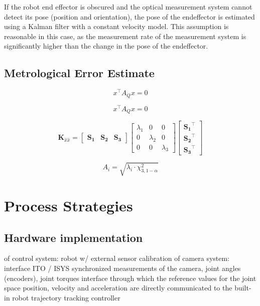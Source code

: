 \documentclass[5p,times,procedia]{elsarticle}
\begin{document}
If the robot end effector is obscured and the optical measurement system cannot detect its pose (position and orientation), the pose of the endeffector is estimated using a Kalman filter with a constant velocity model. This assumption is reasonable in this case, as the measurement rate of the measurement system is significantly higher than the change in the pose of the endeffector.

\subsection{Metrological Error Estimate}
\label{error_estimate}

\cite{Di_Leo_2011}
\cite{Liu_2021}

\begin{equation}
	x^\top A_Q x = 0
\end{equation}

\begin{equation}
	x^\top A_Q x = 0
\end{equation}


\begin{equation}
	\label{eqn:CofactorM}
	\mathbf{K}_{\hat{x}\hat{x}}=
	\begin{bmatrix}	\mathbf{S_1} & \mathbf{S_2} & \mathbf{S_3}\end{bmatrix}
	\begin{bmatrix}
	 	 \lambda_{1}  & 0 & 0 \\
		0 &  \lambda_{2}  & 0\\
		0 & 0 &  \lambda_{3}
	\end{bmatrix}
	\begin{bmatrix}
		\mathbf{S_1}^\top \\
		\mathbf{S_2}^\top \\
		\mathbf{S_3}^\top
	\end{bmatrix}
\end{equation}

\begin{equation}
	\label{eqn:LengthEllipsoid}
	A_{i}= \sqrt{\lambda_{i}\cdot \chi^{2}_{3,1-\alpha}}
\end{equation}


\cite{Luhmann2003}


\section{Process Strategies}
\subsection{Hardware implementation} of control system: robot w/ external sensor
calibration of camera system: interface ITO / ISYS
synchronized measurements of the camera, joint angles (encoders), joint torques 
interface through which the reference values for the joint space position, velocity and acceleration are directly communicated to the built-in robot trajectory tracking controller
\end{document}
